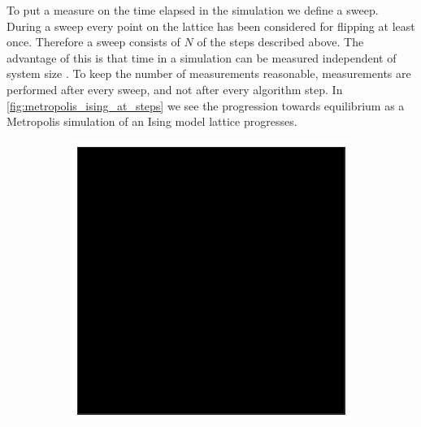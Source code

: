 \documentclass[11pt, a4paper]{report} %
\begin{document}
To put a measure on the time elapsed in the simulation we define a sweep.
During a sweep every point on the lattice has been considered for flipping at least once.
Therefore a sweep consists of \(N\) of the steps described above.
The advantage of this is that time in a simulation can be measured independent of system size \cite{newman:1999}.
To keep the number of measurements reasonable, measurements are performed after every sweep, and not after every algorithm step.
In \cref{fig:metropolis_ising_at_steps} we see the progression towards equilibrium as a Metropolis simulation of an Ising model lattice progresses.

\begin{figure}[htb]
	\centering
	\begin{subfigure}[c]{0.2\linewidth}
		\includegraphics[width=\linewidth]{20160603124433_40_by_40_Lattice_step0.pdf}
	\end{subfigure}
	~
	\begin{subfigure}[c]{0.2\linewidth}

\end{subfigure}
\end{figure}
\end{document}
